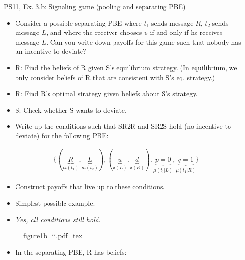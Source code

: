 \begin{frame}{PS11, Ex. 3.b: Signaling game (pooling and separating PBE)}
    \begin{itemize}
        \item[(b)] Consider a possible separating PBE where $t_1$ sends message $R$, $t_2$ sends message $L$, and where the receiver chooses $u$ if and only if he receives message $L$. Can you write down payoffs for this game such that nobody has an incentive to deviate?
    \end{itemize} \vspace{-8pt}
    \begin{multicols}{2}
      \begin{itemize}
        \item[SR3:] R: Find the beliefs of R given S's equilibrium strategy. (In equilibrium, we only consider beliefs of R that are consistent with S's eq. strategy.)
        \item[SR2R:] R: Find R's optimal strategy given beliefs about S's strategy.
        \item[SR2S:] S: Check whether S wants to deviate.
        \item[PBE:]  Write up the conditions such that SR2R and SR2S hold (no incentive to deviate) for the following PBE:
      \end{itemize}\vspace{-14pt}
      \begin{align*}
        \{(\underbrace{R}_{m(t_1)},\underbrace{L}_{m(t_2)}),(\underbrace{u}_{a(L)},\underbrace{d}_{a(R)}),\underbrace{p=0}_{\mu(t_1|L)},\underbrace{q=1}_{\mu(t_1|R)}\}
      \end{align*}\vspace{-12pt}
      \begin{itemize}
        \item[$\rightarrow$] Construct payoffs that live up to these conditions.
        \item[i:] Simplest possible example.
        \item[ii:] \textit{Yes, all conditions still hold.}
      \end{itemize}
      \vfill\null\columnbreak
      \begin{figure}[!h]
        \center{}
        {figure1b_ii.pdf_tex}
      \end{figure} \vspace{-8pt}
      \begin{itemize}
        \item[SR3:] In the separating PBE, R has beliefs:\vspace{-10pt}

\end{itemize}
\end{multicols}
\end{frame}
